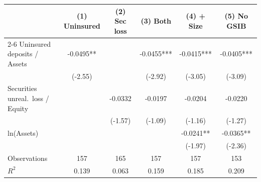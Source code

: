 \begin{tabular}{lccccc}
\toprule
& \multicolumn{1}{c}{(1) Uninsured} & \multicolumn{1}{c}{(2) Sec loss} & \multicolumn{1}{c}{(3) Both} & \multicolumn{1}{c}{(4) + Size} & \multicolumn{1}{c}{(5) No GSIB} \\
\cmidrule(lr){2-6}
Uninsured deposits / Assets & -0.0495** &  & -0.0455*** & -0.0415*** & -0.0405*** \\
 & (-2.55) &  & (-2.92) & (-3.05) & (-3.09) \\[3pt]
Securities unreal.\ loss / Equity &  & -0.0332 & -0.0197 & -0.0204 & -0.0220 \\
 &  & (-1.57) & (-1.09) & (-1.16) & (-1.27) \\[3pt]
ln(Assets) &  &  &  & -0.0241** & -0.0365** \\
 &  &  &  & (-1.97) & (-2.36) \\[3pt]
\midrule
Observations & 157 & 165 & 157 & 157 & 153 \\
$R^2$ & 0.139 & 0.063 & 0.159 & 0.185 & 0.209 \\
\bottomrule
\end{tabular}
